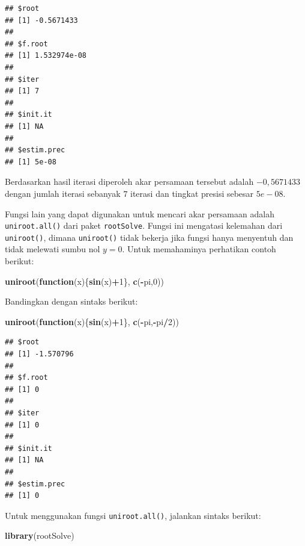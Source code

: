 \documentclass[]{book}
\newenvironment{Shaded}{\begin{snugshade}}{\end{snugshade}}
\newcommand{\ControlFlowTok}[1]{\textcolor[rgb]{0.13,0.29,0.53}{\textbf{#1}}}
\newcommand{\DecValTok}[1]{\textcolor[rgb]{0.00,0.00,0.81}{#1}}
\newcommand{\KeywordTok}[1]{\textcolor[rgb]{0.13,0.29,0.53}{\textbf{#1}}}
\newcommand{\NormalTok}[1]{#1}
\newcommand{\OperatorTok}[1]{\textcolor[rgb]{0.81,0.36,0.00}{\textbf{#1}}}
\theoremstyle{definition}
\theoremstyle{definition}
\theoremstyle{definition}
\theoremstyle{remark}
\begin{document}
\begin{verbatim}
## $root
## [1] -0.5671433
## 
## $f.root
## [1] 1.532974e-08
## 
## $iter
## [1] 7
## 
## $init.it
## [1] NA
## 
## $estim.prec
## [1] 5e-08
\end{verbatim}

Berdasarkan hasil iterasi diperoleh akar persamaan tersebut adalah \(-0,5671433\) dengan jumlah iterasi sebanyak \(7\) iterasi dan tingkat presisi sebesar \(5e-08\).

Fungsi lain yang dapat digunakan untuk mencari akar persamaan adalah \texttt{uniroot.all()} dari paket \texttt{rootSolve}. Fungsi ini mengatasi kelemahan dari \texttt{uniroot()}, dimana \texttt{uniroot()} tidak bekerja jika fungsi hanya menyentuh dan tidak melewati sumbu nol \(y=0\). Untuk memahaminya perhatikan contoh berikut:

\begin{Shaded}
\begin{Highlighting}[]
\KeywordTok{uniroot}\NormalTok{(}\ControlFlowTok{function}\NormalTok{(x)\{}\KeywordTok{sin}\NormalTok{(x)}\OperatorTok{+}\DecValTok{1}\NormalTok{\}, }\KeywordTok{c}\NormalTok{(}\OperatorTok{-}\NormalTok{pi,}\DecValTok{0}\NormalTok{))}
\end{Highlighting}
\end{Shaded}

Bandingkan dengan sintaks berikut:

\begin{Shaded}
\begin{Highlighting}[]
\KeywordTok{uniroot}\NormalTok{(}\ControlFlowTok{function}\NormalTok{(x)\{}\KeywordTok{sin}\NormalTok{(x)}\OperatorTok{+}\DecValTok{1}\NormalTok{\}, }\KeywordTok{c}\NormalTok{(}\OperatorTok{-}\NormalTok{pi,}\OperatorTok{-}\NormalTok{pi}\OperatorTok{/}\DecValTok{2}\NormalTok{))}
\end{Highlighting}
\end{Shaded}

\begin{verbatim}
## $root
## [1] -1.570796
## 
## $f.root
## [1] 0
## 
## $iter
## [1] 0
## 
## $init.it
## [1] NA
## 
## $estim.prec
## [1] 0
\end{verbatim}

Untuk menggunakan fungsi \texttt{uniroot.all()}, jalankan sintaks berikut:

\begin{Shaded}
\begin{Highlighting}[]
\KeywordTok{library}\NormalTok{(rootSolve)}
\end{Highlighting}
\end{Shaded}
\end{document}
